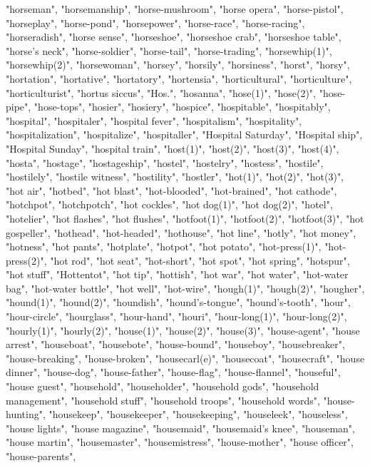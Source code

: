 "horseman",
"horsemanship",
"horse-mushroom",
"horse opera",
"horse-pistol",
"horseplay",
"horse-pond",
"horsepower",
"horse-race",
"horse-racing",
"horseradish",
"horse sense",
"horseshoe",
"horseshoe crab",
"horseshoe table",
"horse's neck",
"horse-soldier",
"horse-tail",
"horse-trading",
"horsewhip(1)",
"horsewhip(2)",
"horsewoman",
"horsey",
"horsily",
"horsiness",
"horst",
"horsy",
"hortation",
"hortative",
"hortatory",
"hortensia",
"horticultural",
"horticulture",
"horticulturist",
"hortus siccus",
"Hos.",
"hosanna",
"hose(1)",
"hose(2)",
"hose-pipe",
"hose-tops",
"hosier",
"hosiery",
"hospice",
"hospitable",
"hospitably",
"hospital",
"hospitaler",
"hospital fever",
"hospitalism",
"hospitality",
"hospitalization",
"hospitalize",
"hospitaller",
"Hospital Saturday",
"Hospital ship",
"Hospital Sunday",
"hospital train",
"host(1)",
"host(2)",
"host(3)",
"host(4)",
"hosta",
"hostage",
"hostageship",
"hostel",
"hostelry",
"hostess",
"hostile",
"hostilely",
"hostile witness",
"hostility",
"hostler",
"hot(1)",
"hot(2)",
"hot(3)",
"hot air",
"hotbed",
"hot blast",
"hot-blooded",
"hot-brained",
"hot cathode",
"hotchpot",
"hotchpotch",
"hot cockles",
"hot dog(1)",
"hot dog(2)",
"hotel",
"hotelier",
"hot flashes",
"hot flushes",
"hotfoot(1)",
"hotfoot(2)",
"hotfoot(3)",
"hot gospeller",
"hothead",
"hot-headed",
"hothouse",
"hot line",
"hotly",
"hot money",
"hotness",
"hot pants",
"hotplate",
"hotpot",
"hot potato",
"hot-press(1)",
"hot-press(2)",
"hot rod",
"hot seat",
"hot-short",
"hot spot",
"hot spring",
"hotspur",
"hot stuff",
"Hottentot",
"hot tip",
"hottish",
"hot war",
"hot water",
"hot-water bag",
"hot-water bottle",
"hot well",
"hot-wire",
"hough(1)",
"hough(2)",
"hougher",
"hound(1)",
"hound(2)",
"houndish",
"hound's-tongue",
"hound's-tooth",
"hour",
"hour-circle",
"hourglass",
"hour-hand",
"houri",
"hour-long(1)",
"hour-long(2)",
"hourly(1)",
"hourly(2)",
"house(1)",
"house(2)",
"house(3)",
"house-agent",
"house arrest",
"houseboat",
"housebote",
"house-bound",
"houseboy",
"housebreaker",
"house-breaking",
"house-broken",
"housecarl(e)",
"housecoat",
"housecraft",
"house dinner",
"house-dog",
"house-father",
"house-flag",
"house-flannel",
"houseful",
"house guest",
"household",
"householder",
"household gods",
"household management",
"household stuff",
"household troops",
"household words",
"house-hunting",
"housekeep",
"housekeeper",
"housekeeping",
"houseleek",
"houseless",
"house lights",
"house magazine",
"housemaid",
"housemaid's knee",
"houseman",
"house martin",
"housemaster",
"housemistress",
"house-mother",
"house officer",
"house-parents",
